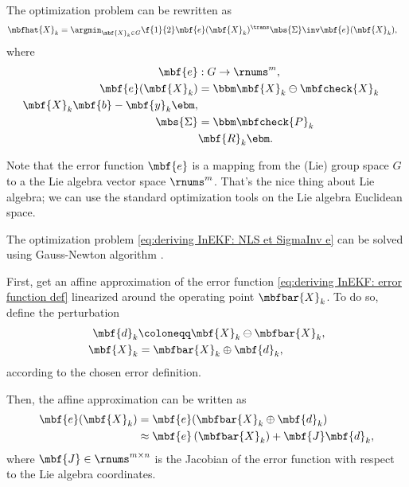 The optimization problem can be rewritten as
\begin{align}
    \label{eq:deriving InEKF: NLS et SigmaInv e}
    \mbfhat{X}_{k} &= \argmin_{\mbf{X}_{k}\in G} \f{1}{2}\mbf{e}(\mbf{X}_{k})^{\trans}\mbs{\Sigma}\inv\mbf{e}(\mbf{X}_{k}),
\end{align}
where
\begin{align}
    \label{eq:deriving InEKF: error function def}
    \mbf{e} &: G \to \rnums^{m},\\
    \mbf{e}(\mbf{X}_{k}) &=
    \bbm
        \mbf{X}_{k} \ominus \mbfcheck{X}_{k}\\
        \mbf{X}_{k}\mbf{b} - \mbf{y}_{k}
    \ebm,\\
    \mbs{\Sigma} &=
    \bbm
        \mbfcheck{P}_{k} & \\ & \mbf{R}_{k}
    \ebm.
\end{align}
\begin{remark}
    Note that the error function $\mbf{e}$ is a mapping from the (Lie) group space $G$ to a the Lie algebra vector space $\rnums^{m}$. That's the nice thing about Lie algebra; we can use the standard optimization tools on the Lie algebra Euclidean space.
\end{remark}

The optimization problem \eqref{eq:deriving InEKF: NLS et SigmaInv e} can be solved using Gauss-Newton algorithm \cite{Nocedal_Numerical_2006,Barfoot_State_2017a,Dellaert_Factor_2017}.

First, get an affine approximation of the error function \eqref{eq:deriving InEKF: error function def} linearized around the operating point $\mbfbar{X}_{k}$. To do so, define the perturbation 
\begin{align}
    \mbf{d}_{k} &\coloneqq \mbf{X}_{k}\ominus\mbfbar{X}_{k},\\
    \label{eq:deriving InEKF: X_k = Xbar oplus dk}
    \mbf{X}_{k} &= \mbfbar{X}_{k} \oplus\mbf{d}_{k},
\end{align}
according to the chosen error definition.

Then, the affine approximation can be written as
\begin{align}
    \label{eq:InEKF derivation: error affine approx}
    \mbf{e}(\mbf{X}_{k}) &= \mbf{e}(\mbfbar{X}_{k}\oplus\mbf{d}_{k})\\
    &\approx \mbf{e}\left( \mbfbar{X}_{k}  \right) + \mbf{J}\mbf{d}_{k},
\end{align}
where $\mbf{J}\in\rnums^{m\times n}$ is the Jacobian of the error function with respect to the Lie algebra coordinates.

